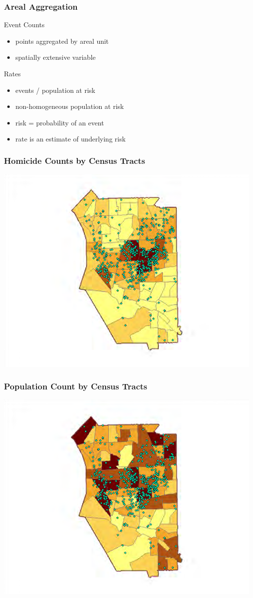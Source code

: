 \documentclass[nototal]{beamer}
\begin{document}
	 \begin{frame}
	   \frametitle{Areal Aggregation}
	   \begin{block}{Event Counts}
	     \begin{itemize}
	       \item points aggregated by areal unit
	       \item spatially extensive variable
	     \end{itemize}
	    \end{block}
	    \begin{block}{Rates}
	      \begin{itemize}
		\item events / population at risk
		\item non-homogeneous population at risk
		\item risk = probability of an event
		\item rate is an estimate of underlying risk
	      \end{itemize}
	    \end{block}
	  \end{frame}

	  \begin{frame}
	    \frametitle{Homicide Counts by Census Tracts}
	    \begin{center}
	      \includegraphics[width=.65\linewidth]{homocideCounts.png}
	    \end{center}
	  \end{frame}

	  \begin{frame}
	    \frametitle{Population Count by Census Tracts}
	    \begin{center}
	      \includegraphics[width=.65\linewidth]{populationCounts.png}
	    \end{center}
	  \end{frame}
\end{document}
